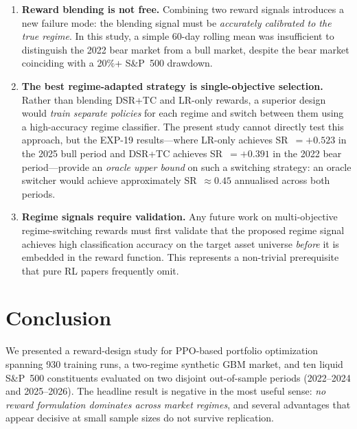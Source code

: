 \documentclass[conference]{IEEEtran}
\begin{document}
\begin{enumerate}
  \item \textbf{Reward blending is not free.} Combining two reward
    signals introduces a new failure mode: the blending signal must be
    \emph{accurately calibrated to the true regime}. In this study,
    a simple 60-day rolling mean was insufficient to distinguish the
    2022 bear market from a bull market, despite the bear market
    coinciding with a 20\%+ S\&P~500 drawdown.

  \item \textbf{The best regime-adapted strategy is single-objective
    selection.} Rather than blending DSR+TC and LR-only rewards, a
    superior design would \emph{train separate policies} for each regime
    and switch between them using a high-accuracy regime classifier.
    The present study cannot directly test this approach, but the EXP-19
    results—where LR-only achieves SR~$=+0.523$ in the 2025 bull period
    and DSR+TC achieves SR~$=+0.391$ in the 2022 bear period—provide
    an \emph{oracle upper bound} on such a switching strategy:
    an oracle switcher would achieve approximately SR~$\approx 0.45$
    annualised across both periods.

  \item \textbf{Regime signals require validation.} Any future work on
    multi-objective regime-switching rewards must first validate that
    the proposed regime signal achieves high classification accuracy
    on the target asset universe \emph{before} it is embedded in the
    reward function. This represents a non-trivial prerequisite that
    pure RL papers frequently omit.
\end{enumerate}

\section{Conclusion}
\label{sec:conclusion}

We presented a reward-design study for PPO-based portfolio optimization
spanning 930 training runs, a two-regime synthetic GBM market, and ten
liquid S\&P~500 constituents evaluated on two disjoint out-of-sample
periods (2022--2024 and 2025--2026). The headline result is negative in
the most useful sense: \emph{no reward formulation dominates across
market regimes}, and several advantages that appear decisive at small
sample sizes do not survive replication.
\end{document}
